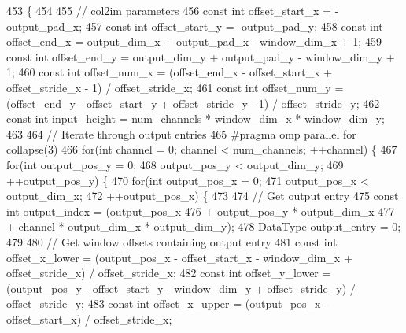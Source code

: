 \begin{DoxyCode}
453                                           \{
454 
455   \textcolor{comment}{// col2im parameters}
456   \textcolor{keyword}{const} \textcolor{keywordtype}{int} offset\_start\_x = -output\_pad\_x;
457   \textcolor{keyword}{const} \textcolor{keywordtype}{int} offset\_start\_y = -output\_pad\_y;
458   \textcolor{keyword}{const} \textcolor{keywordtype}{int} offset\_end\_x = output\_dim\_x + output\_pad\_x - window\_dim\_x + 1;
459   \textcolor{keyword}{const} \textcolor{keywordtype}{int} offset\_end\_y = output\_dim\_y + output\_pad\_y - window\_dim\_y + 1;
460   \textcolor{keyword}{const} \textcolor{keywordtype}{int} offset\_num\_x = (offset\_end\_x - offset\_start\_x + offset\_stride\_x - 1) / offset\_stride\_x;
461   \textcolor{keyword}{const} \textcolor{keywordtype}{int} offset\_num\_y = (offset\_end\_y - offset\_start\_y + offset\_stride\_y - 1) / offset\_stride\_y;
462   \textcolor{keyword}{const} \textcolor{keywordtype}{int} input\_height = num\_channels * window\_dim\_x * window\_dim\_y;
463 
464   \textcolor{comment}{// Iterate through output entries}
465 \textcolor{preprocessor}{  #pragma omp parallel for collapse(3)}
466   \textcolor{keywordflow}{for}(\textcolor{keywordtype}{int} channel = 0; channel < num\_channels; ++channel) \{
467     \textcolor{keywordflow}{for}(\textcolor{keywordtype}{int} output\_pos\_y = 0;
468         output\_pos\_y < output\_dim\_y;
469         ++output\_pos\_y) \{
470       \textcolor{keywordflow}{for}(\textcolor{keywordtype}{int} output\_pos\_x = 0;
471           output\_pos\_x < output\_dim\_x;
472           ++output\_pos\_x) \{
473 
474         \textcolor{comment}{// Get output entry}
475         \textcolor{keyword}{const} \textcolor{keywordtype}{int} output\_index = (output\_pos\_x
476                                   + output\_pos\_y * output\_dim\_x
477                                   + channel * output\_dim\_x * output\_dim\_y);
478         DataType output\_entry = 0;
479 
480         \textcolor{comment}{// Get window offsets containing output entry}
481         \textcolor{keyword}{const} \textcolor{keywordtype}{int} offset\_x\_lower = (output\_pos\_x - offset\_start\_x - window\_dim\_x + offset\_stride\_x) / 
      offset\_stride\_x;
482         \textcolor{keyword}{const} \textcolor{keywordtype}{int} offset\_y\_lower = (output\_pos\_y - offset\_start\_y - window\_dim\_y + offset\_stride\_y) / 
      offset\_stride\_y;
483         \textcolor{keyword}{const} \textcolor{keywordtype}{int} offset\_x\_upper = (output\_pos\_x - offset\_start\_x) / offset\_stride\_x;

\end{DoxyCode}
